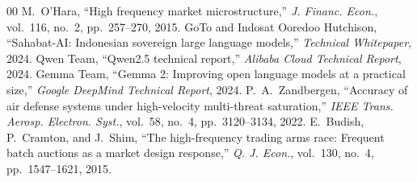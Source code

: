 \documentclass[journal,compsoc]{IEEEtran}
\begin{document}
\begin{thebibliography}{00}
 M.~O'Hara, ``High frequency market microstructure,'' \textit{J. Financ. Econ.}, vol.~116, no.~2, pp.~257--270, 2015.
 GoTo and Indosat Ooredoo Hutchison, ``Sahabat-AI: Indonesian sovereign large language models,'' \textit{Technical Whitepaper}, 2024.
 Qwen Team, ``Qwen2.5 technical report,'' \textit{Alibaba Cloud Technical Report}, 2024.
 Gemma Team, ``Gemma 2: Improving open language models at a practical size,'' \textit{Google DeepMind Technical Report}, 2024.
 P.~A.~Zandbergen, ``Accuracy of air defense systems under high-velocity multi-threat saturation,'' \textit{IEEE Trans. Aerosp. Electron. Syst.}, vol.~58, no.~4, pp.~3120--3134, 2022.
 E.~Budish, P.~Cramton, and J.~Shim, ``The high-frequency trading arms race: Frequent batch auctions as a market design response,'' \textit{Q. J. Econ.}, vol.~130, no.~4, pp.~1547--1621, 2015.
\end{thebibliography}
\end{document}

